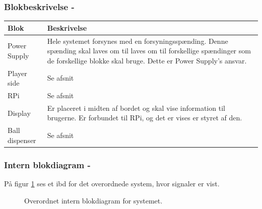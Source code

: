 \documentclass[Arkitektur/System_main.tex]{subfiles}
\begin{document}
\subsubsection{Blokbeskrivelse - }

\begin{table}[H]
\centering
\begin{tabular}{|L{0.2\columnwidth}|L{0.7\columnwidth}|}
\hline
\textbf{Blok} & \textbf{Beskrivelse} \\ \hline
Power Supply & Hele systemet forsynes med en forsyningsspænding. Denne spænding skal laves om til laves om til forskellige spændinger som de forskellige blokke skal bruge. Dette er Power Supply's ansvar.\\ \hline
Player side & Se afsnit \textit{} \\ \hline
RPi & Se afsnit \textit{}  \\ \hline
Display & Er placeret i midten af bordet og skal vise information til brugerne. Er forbundet til RPi, og det er vises er styret af den. \\ \hline
Ball dispenser & Se afsnit \textit{}   \\ \hline
\end{tabular}
\end{table}

\subsubsection{Intern blokdiagram - }

På figur \ref{fig:overall_hardware_ibd} ses et ibd for det overordnede system, hvor signaler er vist.

\begin{figure}[H]
    \centering
    \caption{Overordnet intern blokdiagram for systemet.}
    \label{fig:overall_hardware_ibd}
\end{figure}
\end{document}
